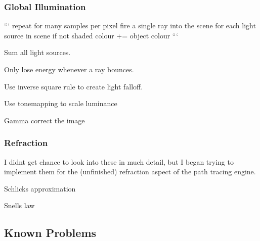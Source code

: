 \subsubsection*{Global Illumination}

``` repeat for many samples per pixel fire a single ray into the scene for each light source in scene if not shaded colour += object colour ```
\begin{DoxyItemize}
\item Sum all light sources.
\item Only lose energy whenever a ray bounces.
\item Use inverse square rule to create light falloff.
\item Use tonemapping to scale luminance
\begin{DoxyItemize}
\item Gamma correct the image
\end{DoxyItemize}
\end{DoxyItemize}

\subsubsection*{Refraction}

I didn\textquotesingle{}t get chance to look into these in much detail, but I began trying to implement them for the (unfinished) refraction aspect of the path tracing engine.


\begin{DoxyItemize}
\item Schlick\textquotesingle{}s approximation
\item Snell\textquotesingle{}s law
\end{DoxyItemize}

\subsection*{Known Problems}


